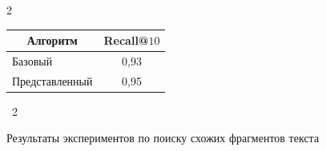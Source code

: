 \begin{multicols}{2}
\begin{center}
\vspace*{6pt}












{\small \begin{tabular}{|l|c|}


\hline 


\multicolumn{1}{|c|}{\bf Алгоритм} & \bf  Recall@$10$  \\ 


\hline


Базовый & 0,93\\




Представленный&  0,95 \\


\hline


\end{tabular}


}


\end{center}






\begin{center}


\noindent


\parbox{202pt}{{{\tablename~2}\ \ \small{


Результаты экспериментов по поиску схожих фрагментов текста


}}


}








\vspace*{6pt}









{\small 


\tabcolsep=7pt


\begin{tabular}{|l|c|c|c|}



\end{tabular}}
\end{center}
\end{multicols}
